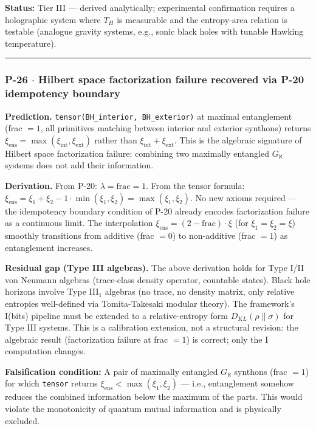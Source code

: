 \documentclass[12pt,a4paper]{article}
\begin{document}
\textbf{Status:} Tier III --- derived analytically; experimental confirmation requires a holographic system where $T_H$ is measurable and the entropy-area relation is testable (analogue gravity systems, e.g., sonic black holes with tunable Hawking temperature).

\begin{center}
\rule{0.5\textwidth}{0.4pt}
\end{center}

\subsubsection{P-26 $\cdot$ Hilbert space factorization failure recovered via P-20 idempotency boundary}

\textbf{Prediction.} \texttt{tensor(BH\_interior, BH\_exterior)} at maximal entanglement (frac $= 1$, all primitives matching between interior and exterior synthons) returns $\xi_{\text{ens}} = \max(\xi_{\text{int}}, \xi_{\text{ext}})$ rather than $\xi_{\text{int}} + \xi_{\text{ext}}$. This is the algebraic signature of Hilbert space factorization failure: combining two maximally entangled $G_{\aleph}$ systems does not add their information.

\textbf{Derivation.} From P-20: $\lambda = \text{frac} = 1$. From the tensor formula: $\xi_{\text{ens}} = \xi_1 + \xi_2 - 1 \cdot \min(\xi_1, \xi_2) = \max(\xi_1, \xi_2)$. No new axioms required --- the idempotency boundary condition of P-20 already encodes factorization failure as a continuous limit. The interpolation $\xi_{\text{ens}} = (2 - \text{frac}) \cdot \xi$ (for $\xi_1 = \xi_2 = \xi$) smoothly transitions from additive (frac $= 0$) to non-additive (frac $= 1$) as entanglement increases.

\textbf{Residual gap (Type III algebras).} The above derivation holds for Type I/II von Neumann algebras (trace-class density operator, countable states). Black hole horizons involve Type III$_1$ algebras (no trace, no density matrix, only relative entropies well-defined via Tomita-Takesaki modular theory). The framework's I(bits) pipeline must be extended to a relative-entropy form $D_{KL}(\rho \| \sigma)$ for Type III systems. This is a calibration extension, not a structural revision: the algebraic result (factorization failure at frac $= 1$) is correct; only the I computation changes.

\textbf{Falsification condition:} A pair of maximally entangled $G_{\aleph}$ synthons (frac $= 1$) for which \texttt{tensor} returns $\xi_{\text{ens}} < \max(\xi_1, \xi_2)$ --- i.e., entanglement somehow reduces the combined information below the maximum of the parts. This would violate the monotonicity of quantum mutual information and is physically excluded.
\end{document}
